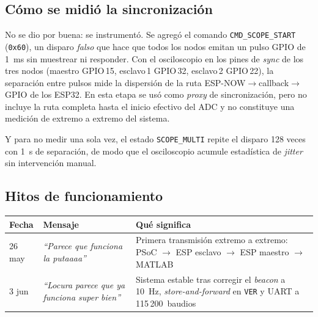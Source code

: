 \subsection{C\'omo se midi\'o la sincronizaci\'on}

No se dio por buena: se instrument\'o. Se agreg\'o el comando
\verb|CMD_SCOPE_START| (\texttt{0x60}), un disparo \emph{falso} que hace que
todos los nodos emitan un pulso GPIO de \SI{1}{\milli\second} sin muestrear ni
responder. Con el osciloscopio en los pines de \emph{sync} de los tres nodos
(maestro GPIO\,15, esclavo\,1 GPIO\,32, esclavo\,2 GPIO\,22), la separaci\'on
entre pulsos mide la dispersi\'on de la ruta ESP-NOW$\to$callback$\to$GPIO de los
ESP32. En esta etapa se us\'o como \emph{proxy} de sincronizaci\'on, pero no incluye
la ruta completa hasta el inicio efectivo del ADC y no constituye una medici\'on
de extremo a extremo del sistema.

Y para no medir una sola vez, el estado \verb|SCOPE_MULTI| repite el disparo
128 veces con \SI{1}{\second} de separaci\'on, de modo que el osciloscopio
acumule estad\'istica de \emph{jitter} sin intervenci\'on manual.



\subsection{Hitos de funcionamiento}

\begin{center}\small
\begin{tabularx}{\textwidth}{@{}l l X@{}}
\toprule
\textbf{Fecha} & \textbf{Mensaje} & \textbf{Qu\'e significa} \\
\midrule
26 may & \emph{``Parece que funciona la putaaaa''} & Primera transmisi\'on extremo a extremo: PSoC $\to$ ESP esclavo $\to$ ESP maestro $\to$ MATLAB \\
3 jun & \emph{``Locura parece que ya funciona super bien''} & Sistema estable tras corregir el \emph{beacon} a \SI{10}{\hertz}, \emph{store-and-forward} en \texttt{VER} y UART a 115\,200~baudios \\
\bottomrule
\end{tabularx}
\end{center}

